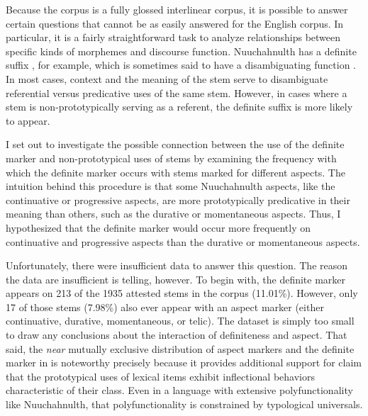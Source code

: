 Because the  corpus is a fully glossed interlinear corpus, it is possible to answer certain questions that cannot be as easily answered for the English corpus. In particular, it is a fairly straightforward task to analyze relationships between specific kinds of morphemes and discourse function. Nuuchahnulth has a definite suffix , for example, which is sometimes said to have a disambiguating function \parencites[60-63]{Mithun1999}[48]{Nakayama2001}. In most cases, context and the meaning of the stem serve to disambiguate referential versus predicative uses of the same stem. However, in cases where a stem is non-prototypically serving as a referent, the definite suffix is more likely to appear.

I set out to investigate the possible connection between the use of the definite marker and non-prototypical uses of stems by examining the frequency with which the definite marker occurs with stems marked for different aspects.  The intuition behind this procedure is that some Nuuchahnulth aspects, like the continuative or progressive aspects, are more prototypically predicative in their meaning than others, such as the durative or momentaneous aspects. Thus, I hypothesized that the definite marker would occur more frequently on continuative and progressive aspects than the durative or momentaneous aspects.

Unfortunately, there were insufficient data to answer this question. The reason the data are insufficient is telling, however. To begin with, the definite marker appears on 213 of the 1935 attested stems in the corpus (11.01\%). However, only 17 of those stems (7.98\%) also ever appear with an aspect marker (either continuative, durative, momentaneous, or telic). The dataset is simply too small to draw any conclusions about the interaction of definiteness and aspect. That said, the \emph{near} mutually exclusive distribution of aspect markers and the definite marker in  is noteworthy precisely because it provides additional support for  claim that the prototypical uses of lexical items exhibit inflectional behaviors characteristic of their class. Even in a language with extensive polyfunctionality like Nuuchahnulth, that polyfunctionality is constrained by typological universals.

